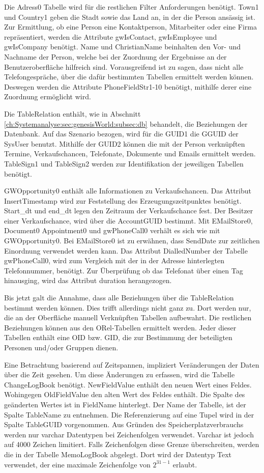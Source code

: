 Die Adress0 Tabelle wird für die restlichen Filter Anforderungen benötigt. Town1 und Country1 geben die Stadt sowie das Land an, in der die Person ansässig ist. Zur Ermittlung, ob eine Person eine Kontaktperson, Mitarbeiter oder eine Firma repräsentiert, werden die Attribute gwIsContact, gwIsEmployee und gwIsCompany benötigt. Name und ChristianName beinhalten den Vor- und Nachname der Person, welche bei der Zuordnung der Ergebnisse an der Benutzeroberfläche hilfreich sind. Vorausgreifend ist zu sagen, dass nicht alle Telefongespräche, über die dafür bestimmten Tabellen ermittelt werden können. Deswegen werden die Attribute PhoneFieldStr1-10 benötigt, mithilfe derer eine Zuordnung ermöglicht wird. 

Die TableRelation enthält, wie in Abschnitt \ref{ch:Systemanalyse:sec:genesisWorld:subsec:db} behandelt, die Beziehungen der Datenbank. Auf das Szenario bezogen, wird für die GUID1 die GGUID der SysUser benutzt. Mithilfe der GUID2 können die mit der Person verknüpften Termine, Verkaufschancen, Telefonate, Dokumente und Emails ermittelt werden. TableSign1 und TableSign2 werden zur Identifikation der jeweiligen Tabellen benötigt.

GWOpportunity0 enthält alle Informationen zu Verkaufschancen. Das Attribut InsertTimestamp wird zur Feststellung des Erzeugungszeitpunktes benötigt. Start\_dt und end\_dt legen den Zeitraum der Verkaufschance fest. Der Besitzer einer Verkaufschance, wird über die AccountGUID bestimmt. Mit EMailStore0, Document0 Appointment0 und gwPhoneCall0 verhält es sich wie mit GWOpportunity0. Bei EMailStore0 ist zu erwähnen, dass SendDate zur zeitlichen Einordnung verwendet werden kann. Das Attribut DialledNumber der Tabelle gwPhoneCall0, wird zum Vergleich  mit der in der Adresse hinterlegten Telefonnummer, benötigt. Zur Überprüfung ob das Telefonat über einen Tag hinausging, wird das Attribut duration herangezogen.

Bis jetzt galt die Annahme, dass alle Beziehungen über die TableRelation bestimmt werden können. Dies trifft allerdings nicht ganz zu. Dort werden nur, die an der Oberfläche manuell Verknüpften Tabellen aufbewahrt. Die restlichen Beziehungen können aus den ORel-Tabellen ermittelt werden. Jeder dieser Tabellen enthält eine OID bzw. GID, die zur Bestimmung der beteiligten Personen und/oder Gruppen dienen.

Eine Betrachtung basierend auf Zeitspannen, impliziert Veränderungen der  Daten über die Zeit gesehen. Um diese Änderungen zu erfassen, wird die Tabelle ChangeLogBook benötigt. NewFieldValue enthält den neuen Wert eines Feldes. Wohingegen OldFieldValue den alten Wert des Feldes enthält. Die Spalte des geänderten Wertes ist in FieldName hinterlegt. Der Name der Tabelle, ist der Spalte TableName zu entnehmen. Die Referenzierung auf eine Tupel wird in der Spalte TableGUID vorgenommen. Aus Gründen des Speicherplatzverbrauchs werden nur varchar Datentypen bei Zeichenfolgen verwendet. Varchar ist jedoch auf 4000 Zeichen limitiert. Falls Zeichenfolgen diese Grenze überschreiten, werden die in der Tabelle MemoLogBook abgelegt. Dort wird der Datentyp Text verwendet, der eine maximale Zeichenfolge von $2^{31-1}$  erlaubt.